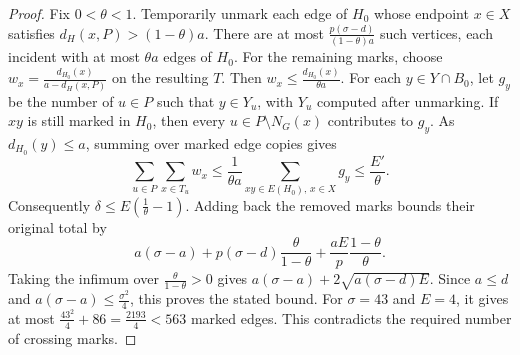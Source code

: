 \begin{proof}
Fix $0<\theta<1$. Temporarily unmark each edge of $H_0$ whose
endpoint $x\in X$ satisfies $d_H(x,P)>(1-\theta)a$. There are at
most $\frac{p(\sigma-d)}{(1-\theta)a}$ such vertices, each incident
with at most $\theta a$ edges of $H_0$. For the remaining marks,
choose $w_x=\frac{d_{H_0}(x)}{a-d_H(x,P)}$ on the resulting $T$.
Then $w_x\leq\frac{d_{H_0}(x)}{\theta a}$. For each $y\in Y\cap B_0$,
let $g_y$ be the number of $u\in P$ such that $y\in Y_u$, with
$Y_u$ computed after unmarking. If $xy$ is still marked in $H_0$,
then every $u\in P\setminus N_G(x)$ contributes to $g_y$. As
$d_{H_0}(y)\leq a$, summing over marked edge copies gives
\[
 \sum_{u\in P}\sum_{x\in T_u}w_x
 \leq\frac{1}{\theta a}\sum_{xy\in E(H_0),\,x\in X}g_y
 \leq\frac{E'}{\theta}.
\]
Consequently $\delta\leq E(\frac{1}{\theta}-1)$. Adding back the
removed marks bounds their original total by
\[
 a(\sigma-a)+p(\sigma-d)\frac{\theta}{1-\theta}
              +\frac{aE}{p}\frac{1-\theta}{\theta}.
\]
Taking the infimum over $\frac{\theta}{1-\theta}>0$ gives
$a(\sigma-a)+2\sqrt{a(\sigma-d)E}$. Since $a\le d$ and
$a(\sigma-a)\le\frac{\sigma^2}{4}$, this proves the stated bound.
For $\sigma=43$ and $E=4$, it gives at most
$\frac{43^2}{4}+86=\frac{2193}{4}<563$ marked edges. This
contradicts the required number of crossing marks.
\end{proof}
